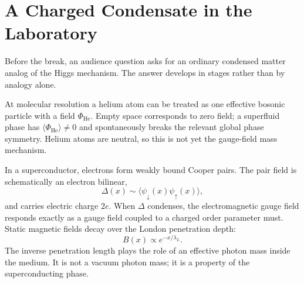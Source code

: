 \begin{classroomqa}
\end{classroomqa}

\section{A Charged Condensate in the Laboratory}

Before the break, an audience question asks for an ordinary condensed
matter analog of the Higgs mechanism. The answer develops in stages rather
than by analogy alone.

\begin{classroomqa}
\end{classroomqa}

At molecular resolution a helium atom can be treated as one effective
bosonic particle with a field \(\Phi_{\mathrm{He}}\). Empty space
corresponds to zero field; a superfluid phase has
\(\langle\Phi_{\mathrm{He}}\rangle\ne0\) and spontaneously breaks the
relevant global phase symmetry. Helium atoms are neutral, so this is not
yet the gauge-field mass mechanism.

In a superconductor, electrons form weakly bound Cooper pairs. The pair
field is schematically an electron bilinear,
\begin{equation}
  \Delta(x)\sim\langle\psi_\downarrow(x)\psi_\uparrow(x)\rangle,
  \label{eq:l10-cooper-order-parameter}
\end{equation}
and carries electric charge \(2e\). When \(\Delta\) condenses, the
electromagnetic gauge field responds exactly as a gauge field coupled to a
charged order parameter must. Static magnetic fields decay over the London
penetration depth:
\begin{equation}
  B(x)\propto e^{-x/\lambda_L}.
  \label{eq:l10-meissner-screening}
\end{equation}
The inverse penetration length plays the role of an effective photon mass
inside the medium. It is not a vacuum photon mass; it is a property of the
superconducting phase.


